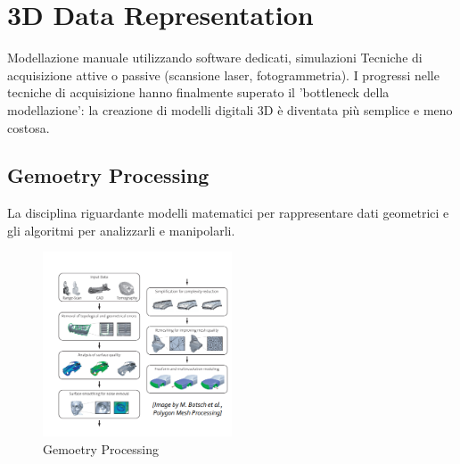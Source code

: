 \section{3D Data Representation}
Modellazione manuale utilizzando software dedicati, 
simulazioni
Tecniche di acquisizione attive o passive (scansione laser,
fotogrammetria).
I progressi nelle tecniche di acquisizione hanno finalmente superato il 'bottleneck della modellazione': la creazione di modelli digitali 3D è diventata più semplice e meno costosa.
\subsection{Gemoetry Processing}
La disciplina riguardante modelli matematici per rappresentare dati geometrici e gli algoritmi per analizzarli e manipolarli.
\begin{figure}[H]
    \centering
    \includegraphics[width=0.5\textwidth]{images/3Drend.png} 
    \caption{Gemoetry Processing}
    \label{fig:immagine}
\end{figure}
